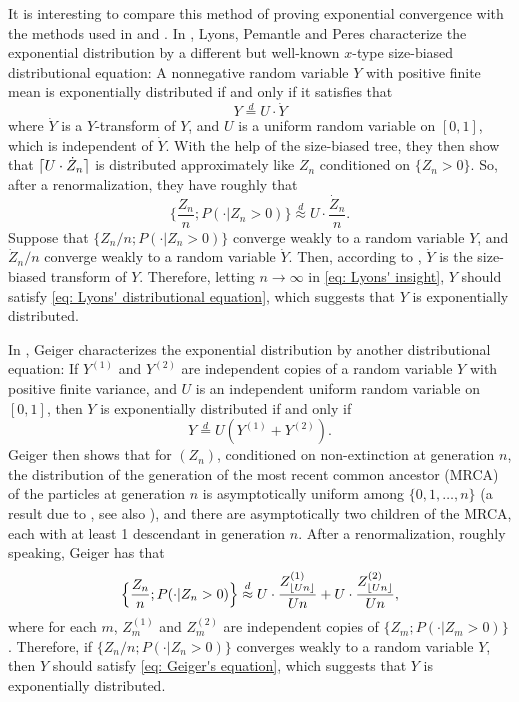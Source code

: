 \documentclass[12pt,a4paper]{amsart}
\DeclarePairedDelimiter\ceil{\lceil}{\rceil}
\DeclarePairedDelimiter\floor{\lfloor}{\rfloor}
\numberwithin{equation}{section}
\begin{document}
	It is interesting to compare this method of proving exponential convergence with the methods 
	used in \cite{geiger2000new} and \cite{lyons1995conceptual}.
	In \cite{lyons1995conceptual}, Lyons, Pemantle and Peres characterize the exponential distribution by a different
but well-known $x$-type size-biased distributional equation:
	A nonnegative random variable $Y$ with positive finite mean is exponentially distributed if and only if it satisfies that
\begin{equation}
\label{eq: Lyons' distributional equation}
		Y 		\overset{d}= U \cdot \dot Y
\end{equation}
   where $\dot Y$ is a $Y$-transform of $Y$,  and $U$ is a uniform random variable on
$[0,1]$, which is independent of $\dot Y$.
    With the help of the size-biased tree, they then show that $\ceil{U \cdot \dot Z_n}$ is distributed approximately like $Z_n$ conditioned on $\{Z_n > 0\}$.
	So, after a renormalization, they have roughly that
\begin{equation}
\label{eq: Lyons' insight}
	\Big\{\frac{Z_n}{n} ; P(  \cdot| Z_n > 0) \Big\}
	\overset{d}{\approx} U \cdot \frac{ \dot Z_n}{n}.
\end{equation}
	Suppose that $\{Z_n/n; P(\cdot | Z_n > 0)\}$ converge weakly to a random variable $Y$, and $\dot Z_n /n$ converge weakly to a random variable $\dot Y$.
	Then, according to \cite[Lemma 4.3]{lyons1995conceptual}, $\dot Y$ is the size-biased transform of $Y$.
	Therefore, letting $n\to \infty$ in \eqref{eq: Lyons' insight}, 
	$Y$ should satisfy \eqref{eq: Lyons' distributional equation}, which suggests that $Y$ is exponentially distributed.
	
	In \cite{geiger2000new}, Geiger characterizes the exponential distribution by another distributional equation:
	If $Y^{(1)}$ and $Y^{(2)}$ are independent copies of 
 a random variable $Y$ with positive finite variance, 
	and $U$ is an independent uniform random variable on $[0,1]$, then $Y$ is exponentially distributed if and only if
\begin{equation}
\label{eq: Geiger's equation}
	Y	\overset{d} = U (Y^{(1)} + Y^{(2)}).
\end{equation}
	Geiger then shows that for $(Z_n)$, conditioned on non-extinction at generation $n$,
	the distribution of the generation of the most recent common ancestor (MRCA) of the particles at generation $n$ is asymptotically uniform among $\{0,1,\dots,n\}$ (a result due to \cite{Zubkov1975}, see also \cite{geiger1999elementary}), and there are asymptotically two children of
the MRCA, each with at least 1 descendant in generation $n$.
	After a renormalization, roughly speaking, Geiger has that
\begin{equation}
\label{eq: Geiger's insight}
	\Big\{\frac{Z_n}{n} ; P(  \cdot| Z_n > 0) \Big\}
		\overset{d}{\approx} U \cdot \frac{ Z^{(1)}_{  \floor{Un}  }}{Un} + U \cdot \frac{ Z^{(2)}_{ \floor{Un} }}{Un} ,
\end{equation}
	where for each $m$, $Z_m^{(1)}$ and $Z_m^{(2)}$ are independent copies of $\{Z_m; P(\cdot | Z_m > 0)\}$.
	Therefore, if $\{Z_n/n; P(\cdot| Z_n > 0)\}$ converges weakly to a random variable $Y$, then $Y$ should satisfy \eqref{eq: Geiger's equation}, which suggests that $Y$ is exponentially distributed.
	
\end{document}
